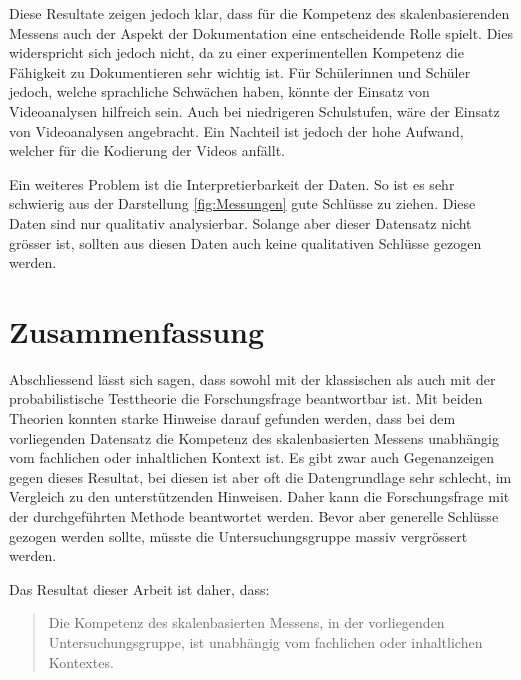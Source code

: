 Diese Resultate zeigen jedoch klar, dass für die Kompetenz des skalenbasierenden Messens auch der Aspekt der Dokumentation eine entscheidende Rolle spielt. Dies widerspricht sich jedoch nicht, da zu einer experimentellen Kompetenz die Fähigkeit zu Dokumentieren sehr wichtig ist. Für Schülerinnen und Schüler jedoch, welche sprachliche Schwächen haben, könnte der Einsatz von Videoanalysen hilfreich sein. Auch bei niedrigeren Schulstufen, wäre der Einsatz von Videoanalysen angebracht. Ein Nachteil ist jedoch der hohe Aufwand, welcher für die Kodierung der Videos anfällt. 

Ein weiteres Problem ist die Interpretierbarkeit der Daten. So ist es sehr schwierig aus der Darstellung \ref{fig:Messungen} gute Schlüsse zu ziehen. Diese Daten sind nur qualitativ analysierbar. Solange aber dieser Datensatz nicht grösser ist, sollten aus diesen Daten auch keine qualitativen Schlüsse gezogen werden.

\section{Zusammenfassung}

Abschliessend lässt sich sagen, dass sowohl mit der klassischen als auch mit der probabilistische Testtheorie die Forschungsfrage beantwortbar ist. Mit beiden Theorien konnten starke Hinweise darauf gefunden werden, dass bei dem vorliegenden Datensatz die Kompetenz des skalenbasierten Messens unabhängig vom fachlichen oder inhaltlichen Kontext ist. Es gibt zwar auch Gegenanzeigen gegen dieses Resultat, bei diesen ist aber oft die Datengrundlage sehr schlecht, im Vergleich zu den unterstützenden Hinweisen. Daher kann die Forschungsfrage mit der durchgeführten Methode beantwortet werden. Bevor aber generelle Schlüsse gezogen werden sollte, müsste die Untersuchungsgruppe massiv vergrössert werden. 

Das Resultat dieser Arbeit ist daher, dass:
\begin{quote}
 Die Kompetenz des skalenbasierten Messens, in der vorliegenden Untersuchungsgruppe, ist unabhängig vom fachlichen oder inhaltlichen Kontextes.
\end{quote}


